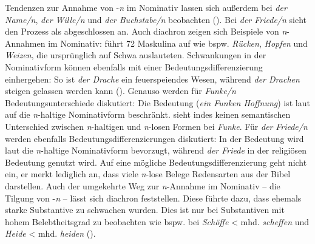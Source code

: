 Tendenzen zur Annahme von -\textit{n} im Nominativ lassen sich außerdem bei \textit{der Name/n}, \textit{der Wille/n} und \textit{der Buchstabe/n} beobachten (\cite[173]{Kopcke.1995}). Bei \textit{der Friede/n} sieht \textcite[173]{Kopcke.1995} den Prozess als abgeschlossen an. Auch diachron zeigen sich Beispiele von \textit{n}-Annahmen im Nominativ: \textcite[113--115, 120]{Kopcke.2000} führt 72 Maskulina auf wie bspw. \textit{Rücken}, \textit{Hopfen} und \textit{Weizen}, die ursprünglich auf Schwa auslauteten. Schwankungen in der Nominativform können ebenfalls mit einer Bedeutungsdifferenzierung einhergehen: So ist \textit{der Drache} ein feuerspeiendes Wesen, während \textit{der Drachen} steigen gelassen werden kann (\cite[173]{Kopcke.1995}). Genauso werden für \textit{Funke/n} Bedeutungsunterschiede diskutiert: Die Bedeutung  (\textit{ein Funken Hoffnung}) ist laut \textcite[403]{Sandberg.1998} auf die \textit{n}-haltige Nominativform beschränkt. \textcite[316--317]{Joeres.1996} sieht indes keinen semantischen Unterschied zwischen \textit{n}-haltigen und \textit{n}-losen Formen bei \textit{Funke}. Für \textit{der} \textit{Friede/n} werden ebenfalls Bedeutungsdifferenzierungen diskutiert: In der Bedeutung  wird laut \textcite[336]{Duden.2016} die \textit{n}-haltige Nominativform bevorzugt, während \textit{der Friede} in der religiösen Bedeutung  genutzt wird. Auf eine mögliche Bedeutungsdifferenzierung geht \textcite[313--316]{Joeres.1996} nicht ein, er merkt lediglich an, dass viele \textit{n}-lose Belege Redensarten aus der Bibel darstellen. 
Auch der umgekehrte Weg zur \textit{n}-Annahme im Nominativ -- die Tilgung von -\textit{n} -- lässt sich diachron feststellen. Diese führte dazu, dass ehemals starke Substantive zu schwachen wurden. Dies ist nur bei Substantiven mit hohem Belebtheitsgrad zu beobachten wie bspw. bei \textit{Schöffe} < mhd. \textit{scheffen} und \textit{Heide} < mhd. \textit{heiden} (\cite[112]{Kopcke.2000}).

